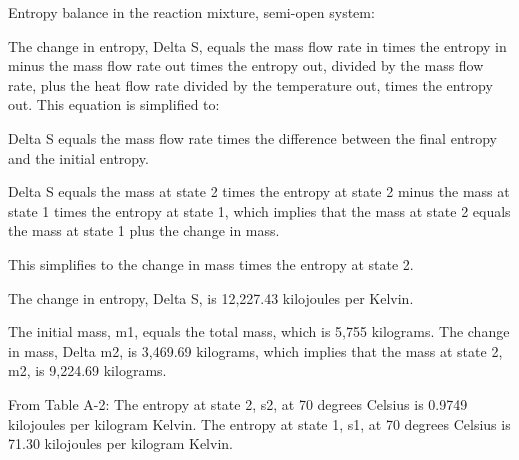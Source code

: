 Entropy balance in the reaction mixture, semi-open system:

The change in entropy, Delta S, equals the mass flow rate in times the entropy in minus the mass flow rate out times the entropy out, divided by the mass flow rate, plus the heat flow rate divided by the temperature out, times the entropy out. This equation is simplified to:

Delta S equals the mass flow rate times the difference between the final entropy and the initial entropy.

Delta S equals the mass at state 2 times the entropy at state 2 minus the mass at state 1 times the entropy at state 1, which implies that the mass at state 2 equals the mass at state 1 plus the change in mass.

This simplifies to the change in mass times the entropy at state 2.

The change in entropy, Delta S, is 12,227.43 kilojoules per Kelvin.

The initial mass, m1, equals the total mass, which is 5,755 kilograms. The change in mass, Delta m2, is 3,469.69 kilograms, which implies that the mass at state 2, m2, is 9,224.69 kilograms.

From Table A-2:
The entropy at state 2, s2, at 70 degrees Celsius is 0.9749 kilojoules per kilogram Kelvin.
The entropy at state 1, s1, at 70 degrees Celsius is 71.30 kilojoules per kilogram Kelvin.